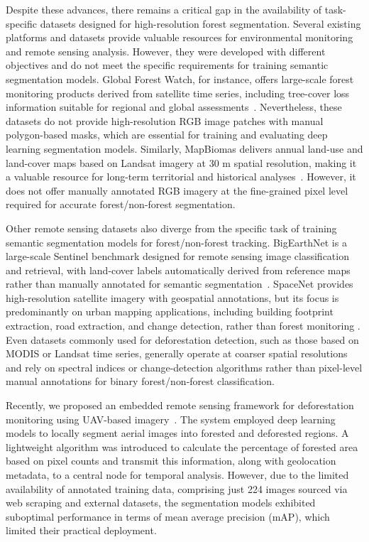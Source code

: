 \documentclass[journal,article,submit,pdftex,moreauthors]{Definitions/mdpi}
\begin{document}
Despite these advances, there remains a critical gap in the availability of task-specific datasets designed for high-resolution forest segmentation. Several existing platforms and datasets provide valuable resources for environmental monitoring and remote sensing analysis. However, they were developed with different objectives and do not meet the specific requirements for training semantic segmentation models. Global Forest Watch, for instance, offers large-scale forest monitoring products derived from satellite time series, including tree-cover loss information suitable for regional and global assessments~\cite{watch2002global}. Nevertheless, these datasets do not provide high-resolution RGB image patches with manual polygon-based masks, which are essential for training and evaluating deep learning segmentation models. Similarly, MapBiomas delivers annual land-use and land-cover maps based on Landsat imagery at 30 m spatial resolution, making it a valuable resource for long-term territorial and historical analyses~\cite{rosa2019mapbiomas}. However, it does not offer manually annotated RGB imagery at the fine-grained pixel level required for accurate forest/non-forest segmentation.

Other remote sensing datasets also diverge from the specific task of training semantic segmentation models for forest/non-forest tracking. BigEarthNet is a large-scale Sentinel benchmark designed for remote sensing image classification and retrieval, with land-cover labels automatically derived from reference maps rather than manually annotated for semantic segmentation~\cite{sumbul2019bigearthnet}. SpaceNet provides high-resolution satellite imagery with geospatial annotations, but its focus is predominantly on urban mapping applications, including building footprint extraction, road extraction, and change detection, rather than forest monitoring \cite{van2018spacenet}. Even datasets commonly used for deforestation detection, such as those based on MODIS or Landsat time series, generally operate at coarser spatial resolutions and rely on spectral indices or change-detection algorithms rather than pixel-level manual annotations for binary forest/non-forest classification.

Recently, we proposed an embedded remote sensing framework for deforestation monitoring using UAV-based imagery~\cite{g10}. The system employed deep learning models to locally segment aerial images into forested and deforested regions. A lightweight algorithm was introduced to calculate the percentage of forested area based on pixel counts and transmit this information, along with geolocation metadata, to a central node for temporal analysis. However, due to the limited availability of annotated training data, comprising just 224 images sourced via web scraping and external datasets, the segmentation models exhibited suboptimal performance in terms of mean average precision (mAP), which limited their practical deployment.
\end{document}
